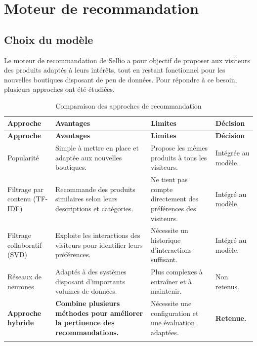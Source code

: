 \section{Moteur de recommandation}

\subsection{Choix du modèle}

Le moteur de recommandation de Sellio a pour objectif de proposer aux visiteurs des produits adaptés à leurs intérêts, tout en restant fonctionnel pour les nouvelles boutiques disposant de peu de données. Pour répondre à ce besoin, plusieurs approches ont été étudiées.

\renewcommand{\arraystretch}{1.4}
\begin{longtable}{|p{3.1cm}|p{4.3cm}|p{4.3cm}|p{2.5cm}|}
\hline
\textbf{Approche} & \textbf{Avantages} & \textbf{Limites} & \textbf{Décision} \\
\hline
\endfirsthead
\hline
\textbf{Approche} & \textbf{Avantages} & \textbf{Limites} & \textbf{Décision} \\
\hline
\endhead

Popularité &
Simple à mettre en place et adaptée aux nouvelles boutiques. &
Propose les mêmes produits à tous les visiteurs. &
Intégrée au modèle. \\
\hline

Filtrage par contenu (TF-IDF) &
Recommande des produits similaires selon leurs descriptions et catégories. &
Ne tient pas compte directement des préférences des visiteurs. &
Intégré au modèle. \\
\hline

Filtrage collaboratif (SVD) &
Exploite les interactions des visiteurs pour identifier leurs préférences. &
Nécessite un historique d'interactions suffisant. &
Intégré au modèle. \\
\hline

Réseaux de neurones &
Adaptés à des systèmes disposant d'importants volumes de données. &
Plus complexes à entraîner et à maintenir. &
Non retenus. \\
\hline

\textbf{Approche hybride} &
\textbf{Combine plusieurs méthodes pour améliorer la pertinence des recommandations.} &
Nécessite une configuration et une évaluation adaptées. &
\textbf{Retenue.} \\
\hline

\caption{Comparaison des approches de recommandation}
\label{tab:comparaison-reco}
\end{longtable}


